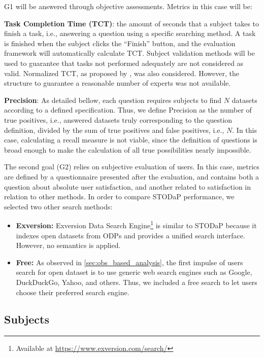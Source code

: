G1 will be answered through objective assessments.
Metrics in this case will be: 

\noindent \textbf{Task Completion Time (TCT)}: the amount of seconds that a subject takes to finish a task, i.e., answering a question using a specific searching method.
A task is finished when the subject clicks the ``Finish'' button, and the evaluation framework will automatically calculate TCT.
Subject validation methods will be used to guarantee that tasks not performed adequately are not considered as valid.
Normalized TCT, as proposed by , was also considered. 
However, the structure to guarantee a reasonable number of experts was not available.

\noindent \textbf{Precision}: As detailed bellow, each question requires subjects to find $N$ datasets according to a defined specification.
Thus, we define Precision as the number of true positives, i.e., answered datasets truly corresponding to the question definition, divided by the sum of true positives and false positives, i.e., $N$.
In this case, calculating a recall measure is not viable, since the definition of questions is broad enough to make the calculation of all true possibilities nearly impossible.


The second goal (G2) relies on subjective evaluation of users.
In this case, metrics are defined by a questionnaire presented after the evaluation, and contains both a question about absolute user satisfaction, and another related to satisfaction in relation to other methods.
In order to compare STODaP performance, we selected two other search methods:

\begin{itemize}
	\item \textbf{Exversion: } Exversion Data Search Engine\footnote{Available at \url{https://www.exversion.com/search/}} is similar to STODaP because it indexes open datasets from ODPs and provides a unified search interface.
	However, no semantics is applied.
	\item \textbf{Free: } As observed in \autoref{sec:obs_based_analysis}, the first impulse of users search for open dataset is to use generic web search engines such as Google, DuckDuckGo, Yahoo, and others.
	Thus, we included a free search to let users choose their preferred search engine.
\end{itemize}

\subsection{Subjects}

